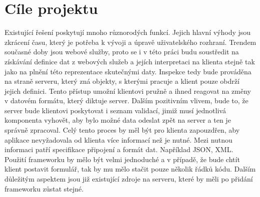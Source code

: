 \section{Cíle projektu}
Existující řešení poskytují mnoho různorodých funkcí. Jejich hlavní výhody jsou zkrácení času, který je potřeba k vývoji a úpravě uživatelského rozhraní. Trendem současné doby jsou webové služby, proto se i v této práci budu soustředit na získávání definice dat z webových služeb a jejích interpretaci na klienta stejně tak jako na plnění této reprezentace skutečnými daty. Inspekce tedy bude prováděna na straně serveru, který zná objekty, s kterými pracuje a klient pouze obdrží jejich definici. Tento přístup umožní klientovi pružně a ihned reagovat na změny v datovém formátu, který diktuje server. Dalším pozitivním vlivem, bude to, že server bude klientovi poskytovat i seznam validací, jimiž musí jednotlivá komponenta vyhovět, aby bylo možné data odeslat zpět na server a ten je správně zpracoval. Celý tento proces by měl být pro klienta zapouzdřen, aby aplikace nevyžadovala od klienta více informací než je nutné. Mezi nutnou informaci patří specifikace připojení a formát dat. Například JSON, XML. Použití frameworku by mělo být velmi jednoduché a v případě, že bude chtít klient postavit formulář, tak by mu mělo stačit pouze několik řádků kódu. Dalším důležitým aspektem jsou již existující zdroje na serveru, které by měli po přidání frameworku zůstat stejné. 